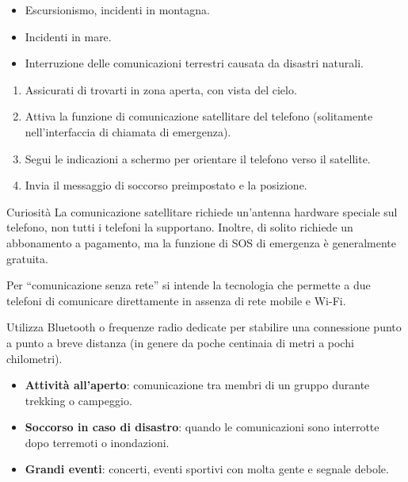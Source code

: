 
\begin{itemize}
  \item Escursionismo, incidenti in montagna.
  \item Incidenti in mare.
  \item Interruzione delle comunicazioni terrestri causata da disastri naturali.
\end{itemize}


\begin{enumerate}
  \item Assicurati di trovarti in zona aperta, con vista del cielo.
  \item Attiva la funzione di comunicazione satellitare del telefono (solitamente nell'interfaccia di chiamata di emergenza).
  \item Segui le indicazioni a schermo per orientare il telefono verso il satellite.
  \item Invia il messaggio di soccorso preimpostato e la posizione.
\end{enumerate}

\begin{tcbinfo}{Curiosità}
La comunicazione satellitare richiede un'antenna hardware speciale sul telefono, non tutti i telefoni la supportano. Inoltre, di solito richiede un abbonamento a pagamento, ma la funzione di SOS di emergenza è generalmente gratuita.

\end{tcbinfo}


Per “comunicazione senza rete” si intende la tecnologia che permette a due telefoni di comunicare direttamente in assenza di rete mobile e Wi-Fi.


Utilizza Bluetooth o frequenze radio dedicate per stabilire una connessione punto a punto a breve distanza (in genere da poche centinaia di metri a pochi chilometri).


\begin{itemize}
  \item \textbf{Attività all'aperto}: comunicazione tra membri di un gruppo durante trekking o campeggio.
  \item \textbf{Soccorso in caso di disastro}: quando le comunicazioni sono interrotte dopo terremoti o inondazioni.
  \item \textbf{Grandi eventi}: concerti, eventi sportivi con molta gente e segnale debole.
\end{itemize}

